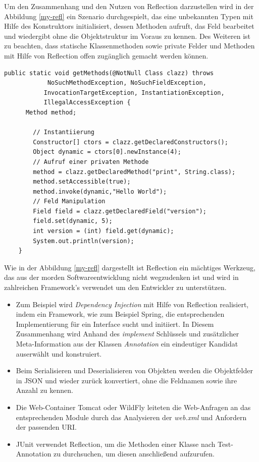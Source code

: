   Um den Zusammenhang und den Nutzen von Reflection darzustellen wird in der Abbildung \ref{my-refl} ein Szenario durchgespielt, das eine unbekannten Typen mit Hilfe des Konstruktors initialisiert, dessen Methoden aufruft, das Feld bearbeitet und wiedergibt ohne die Objektstruktur im Voraus zu kennen. Des Weiteren ist zu beachten, dass statische Klassenmethoden sowie private Felder und Methoden mit Hilfe von Reflection offen zugänglich gemacht werden können.\bigbreak 

  \begin{lstlisting}[caption=Reflection in Aktion,label=my-refl,captionpos=b]
    public static void getMethods(@NotNull Class clazz) throws
            NoSuchMethodException, NoSuchFieldException,
           InvocationTargetException, InstantiationException,
           IllegalAccessException {
      Method method;

        // Instantiierung
        Constructor[] ctors = clazz.getDeclaredConstructors();
        Object dynamic = ctors[0].newInstance(4);
        // Aufruf einer privaten Methode
        method = clazz.getDeclaredMethod("print", String.class);
        method.setAccessible(true);
        method.invoke(dynamic,"Hello World");
        // Feld Manipulation
        Field field = clazz.getDeclaredField("version");
        field.set(dynamic, 5);
        int version = (int) field.get(dynamic);
        System.out.println(version);
    }
  \end{lstlisting}

  Wie in der Abbildung \ref{my-refl} dargestellt ist Reflection ein mächtiges Werkzeug, das aus der morden Softwareentwicklung nicht wegzudenken ist und wird in zahlreichen Framework's verwendet um den Entwickler zu unterstützen. 

  \begin{itemize}
    \item Zum Beispiel wird \textit{Dependency Injection} mit Hilfe von Reflection realisiert, indem ein Framework, wie zum Beispiel Spring, die entsprechenden Implementierung für ein Interface sucht und initiiert. In Diesem Zusammenhang wird Anhand des \textit{implement} Schlüssels und zusätzlicher Meta-Information aus der Klassen \textit{Annotation} ein eindeutiger Kandidat auserwählt und konstruiert.
    \item Beim Serialisieren und Deserialisieren von Objekten werden die Objektfelder in JSON und wieder zurück konvertiert, ohne die Feldnamen sowie ihre Anzahl zu kennen.
    \item Die Web-Container Tomcat oder WildFly leiteten die Web-Anfragen an das entsprechenden Module durch das Analysieren der \textit{web.xml} und Anfordern der passenden URI.
    \item JUnit verwendet Reflection, um die Methoden einer Klasse nach Test-Annotation zu durchsuchen, um diesen anschließend aufzurufen.
  \end{itemize}




